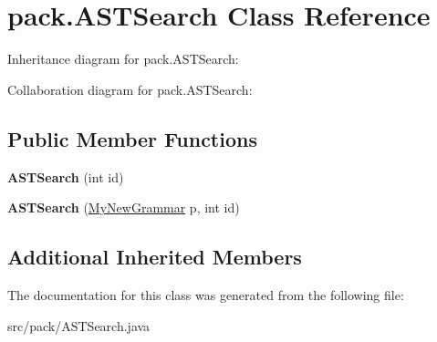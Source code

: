 \hypertarget{classpack_1_1_a_s_t_search}{}\section{pack.\+A\+S\+T\+Search Class Reference}
\label{classpack_1_1_a_s_t_search}


Inheritance diagram for pack.\+A\+S\+T\+Search\+:


Collaboration diagram for pack.\+A\+S\+T\+Search\+:
\subsection*{Public Member Functions}
\begin{DoxyCompactItemize}
\item 
{\bfseries A\+S\+T\+Search} (int id)\hypertarget{classpack_1_1_a_s_t_search_a9d93b59b821ce6b74d944c97daded288}{}\label{classpack_1_1_a_s_t_search_a9d93b59b821ce6b74d944c97daded288}

\item 
{\bfseries A\+S\+T\+Search} (\hyperlink{classpack_1_1_my_new_grammar}{My\+New\+Grammar} p, int id)\hypertarget{classpack_1_1_a_s_t_search_aa36e793f2dd47792f62ae75d6f5f6e74}{}\label{classpack_1_1_a_s_t_search_aa36e793f2dd47792f62ae75d6f5f6e74}

\end{DoxyCompactItemize}
\subsection*{Additional Inherited Members}


The documentation for this class was generated from the following file\+:\begin{DoxyCompactItemize}
\item 
src/pack/A\+S\+T\+Search.\+java\end{DoxyCompactItemize}
